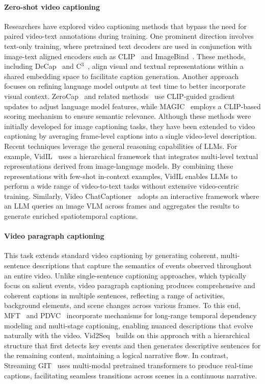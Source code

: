 \paragraph{Zero-shot video captioning}
Researchers have explored video captioning methods that bypass the need for paired video-text annotations during training. 
One prominent direction involves text-only training, where pretrained text decoders are used in conjunction with image-text aligned encoders such as CLIP~\cite{radford2021learning} and ImageBind~\cite{girdhar2023imagebind}. 
These methods, including DeCap~\cite{lidecap} and C$^{3}$~\cite{zhang2024connect}, align visual and textual representations within a shared embedding space to facilitate caption generation.
%
Another approach focuses on refining language model outputs at test time to better incorporate visual context.
ZeroCap~\cite{tewel2021zero} and related methods~\cite{Tewel_2023_BMVC} use CLIP-guided gradient updates to adjust language model features, while MAGIC~\cite{su2022language} employs a CLIP-based scoring mechanism to ensure semantic relevance. 
Although these methods were initially developed for image captioning tasks, they have been extended to video captioning by averaging frame-level captions into a single video-level description.
%
Recent techniques leverage the general reasoning capabilities of LLMs. 
For example, VidIL~\cite{wang2022language} uses a hierarchical framework that integrates multi-level textual representations derived from image-language models. 
By combining these representations with few-shot in-context examples, VidIL enables LLMs to perform a wide range of video-to-text tasks without extensive video-centric training. 
Similarly, Video ChatCaptioner~\cite{chen2023video} adopts an interactive framework where an LLM queries an image VLM across frames and aggregates the results to generate enriched spatiotemporal captions.
%

\vspace{-2mm}
\paragraph{Video paragraph captioning}
This task extends standard video captioning by generating coherent, multi-sentence descriptions that capture the semantics of events observed throughout an entire video. 
Unlike single-sentence captioning approaches, which typically focus on salient events, video paragraph captioning produces comprehensive and coherent captions in multiple sentences, reflecting a range of activities, background elements, and scene changes across various frames. 
To this end, MFT~\cite{xiong2018move} and PDVC~\cite{wang2021end} incorporate mechanisms for long-range temporal dependency modeling and multi-stage captioning, enabling nuanced descriptions that evolve naturally with the video. 
Vid2Seq~\cite{yang2023vid2seq} builds on this approach with a hierarchical structure that first detects key events and then generates descriptive sentences for the remaining content, maintaining a logical narrative flow. 
In contrast, Streaming GIT~\cite{zhou2024streaming} uses multi-modal pretrained transformers to produce real-time captions, facilitating seamless transitions across scenes in a continuous narrative.
